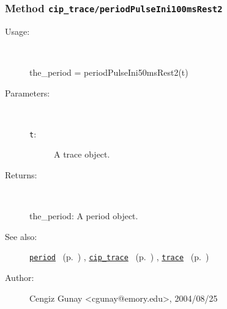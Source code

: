 \subsubsection[Method \texttt{periodPulseIni100msRest2}]{Method \texttt{cip\_trace/periodPulseIni100msRest2}}%
%
\label{ref_cip_trace__periodPulseIni100msRest2}%
\hypertarget{ref_cip_trace__periodPulseIni100msRest2}{}%
\begin{description}
%
\item[Usage:]~%
\begin{lyxcode}%
the\_period = periodPulseIni50msRest2(t)
%
\end{lyxcode}%
%
%
\item[Parameters:]~
\begin{description}%
\item[\texttt{t}:]
 A trace object.
\end{description}%
%
\item[Returns:]~

	the\_period: A period object.
%
%
\item[See also:]%
\hyperlink{ref_period}{\texttt{period}}%
\ (p.~\pageref{ref_period})%
%
, \hyperlink{ref_cip_trace}{\texttt{cip\_trace}}%
\ (p.~\pageref{ref_cip_trace})%
%
, \hyperlink{ref_trace}{\texttt{trace}}%
\ (p.~\pageref{ref_trace})%
%
%
\item[Author:]%
Cengiz Gunay <cgunay@emory.edu>, 2004/08/25%
\end{description}
\methodline%
